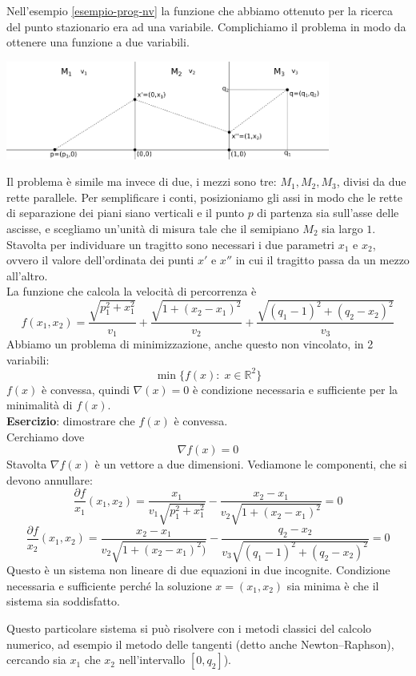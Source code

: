 \begin{example} Nell'esempio \ref{esempio-prog-nv} la funzione che
abbiamo ottenuto per la ricerca del punto stazionario era ad una
variabile. Complichiamo il problema in modo da ottenere una funzione a
due variabili.

\centerline{\includegraphics[width=0.80\textwidth]{imgs/esempio-prog-nv-2var.png}}

Il problema \`e simile ma invece di due, i mezzi sono tre: $M_1, M_2,
M_3$, divisi da due rette parallele. Per semplificare i conti,
posizioniamo gli assi in modo che le rette di separazione dei piani
siano verticali e il punto $p$ di partenza sia sull'asse delle
ascisse, e scegliamo un'unit\`a di misura tale che il semipiano $M_2$
sia largo $1$.\\ Stavolta per individuare un tragitto sono necessari i
due parametri $x_1$ e $x_2$, ovvero il valore dell'ordinata dei punti
$x'$ e $x''$ in cui il tragitto passa da un mezzo all'altro.\\ La
funzione che calcola la velocit\`a di percorrenza \`e $$f(x_1, x_2) =
\frac{\sqrt{p_1^2 + x_1^2}}{v_1} + \frac{\sqrt{1+ (x_2 - x_1)^2}}{v_2}
+ \frac{\sqrt{(q_1 -1)^2 + (q_2 - x_2)^2}}{v_3}$$ Abbiamo un problema
di minimizzazione, anche questo non vincolato, in 2 variabili: $$
\min\{f(x):\; x \in \mathbb{R}^2\}$$ $f(x)$ \`e convessa, quindi
$\nabla(x) = 0$ \`e condizione necessaria e sufficiente per la
minimalit\`a di $f(x)$.\\ \textbf{Esercizio}: dimostrare che $f(x)$ \`e
convessa. \\ Cerchiamo dove $$\nabla f(x) = 0$$ Stavolta $\nabla f(x)$
\`e un vettore a due dimensioni. Vediamone le componenti, che si devono
annullare:\\
$$\frac{\partial f}{x_1}(x_1,x_2) =  \frac{x_1}{v_1 \sqrt{p_1^2+ x_1^2}} - \frac{x_2 - x_1}{v_2 \sqrt{1+(x_2 - x_1)^2}} = 0$$
$$\frac{\partial f}{x_2}(x_1,x_2) =  \frac{x_2-x_1}{v_2 \sqrt{1+( x_2-x_1)^2)}} - \frac{q_2 -x_2}{v_3  \sqrt{(q_1-1)^2 + (q_2 -x_2)^2}} = 0$$
Questo \`e un sistema non lineare di due equazioni in due
incognite. Condizione necessaria e sufficiente perch\'e la soluzione
$x=(x_1,x_2)$ sia minima \`e che il sistema sia soddisfatto.

Questo particolare sistema si può risolvere con i metodi classici del
calcolo numerico, ad esempio il metodo delle tangenti (detto anche
Newton--Raphson), cercando sia $x_1$ che $x_2$ nell'intervallo
$[0,q_2]$).
\end{example}

